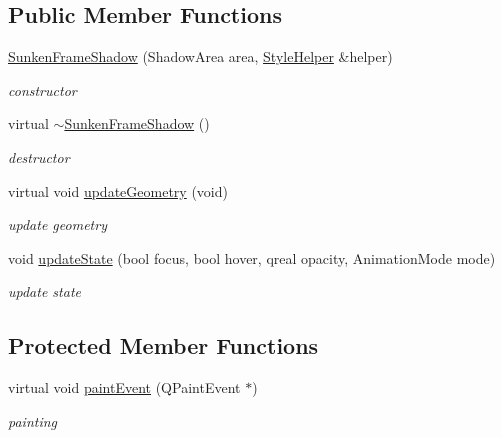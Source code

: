 \subsection*{Public Member Functions}
\begin{DoxyCompactItemize}
\item 
\mbox{\label{class_sunken_frame_shadow_a5701cd580c162d9e5d6b82d3a01f380a}} 
\hyperlink{class_sunken_frame_shadow_a5701cd580c162d9e5d6b82d3a01f380a}{Sunken\+Frame\+Shadow} (Shadow\+Area area, \hyperlink{class_style_helper}{Style\+Helper} \&helper)
\begin{DoxyCompactList}\small\item\em constructor \end{DoxyCompactList}\item 
\mbox{\label{class_sunken_frame_shadow_a52419b3fa571719df40eb01b857b3bf7}} 
virtual \hyperlink{class_sunken_frame_shadow_a52419b3fa571719df40eb01b857b3bf7}{$\sim$\+Sunken\+Frame\+Shadow} ()
\begin{DoxyCompactList}\small\item\em destructor \end{DoxyCompactList}\item 
\mbox{\label{class_sunken_frame_shadow_a448d6b0d811d159eb6612f73b2220a86}} 
virtual void \hyperlink{class_sunken_frame_shadow_a448d6b0d811d159eb6612f73b2220a86}{update\+Geometry} (void)
\begin{DoxyCompactList}\small\item\em update geometry \end{DoxyCompactList}\item 
\mbox{\label{class_sunken_frame_shadow_a18f148fa374b8245967d6fddae1eed81}} 
void \hyperlink{class_sunken_frame_shadow_a18f148fa374b8245967d6fddae1eed81}{update\+State} (bool focus, bool hover, qreal opacity, Animation\+Mode mode)
\begin{DoxyCompactList}\small\item\em update state \end{DoxyCompactList}\end{DoxyCompactItemize}
\subsection*{Protected Member Functions}
\begin{DoxyCompactItemize}
\item 
\mbox{\label{class_sunken_frame_shadow_ab42b7c2660e952bc739994cfcac61bc7}} 
virtual void \hyperlink{class_sunken_frame_shadow_ab42b7c2660e952bc739994cfcac61bc7}{paint\+Event} (Q\+Paint\+Event $\ast$)
\begin{DoxyCompactList}\small\item\em painting \end{DoxyCompactList}\end{DoxyCompactItemize}


